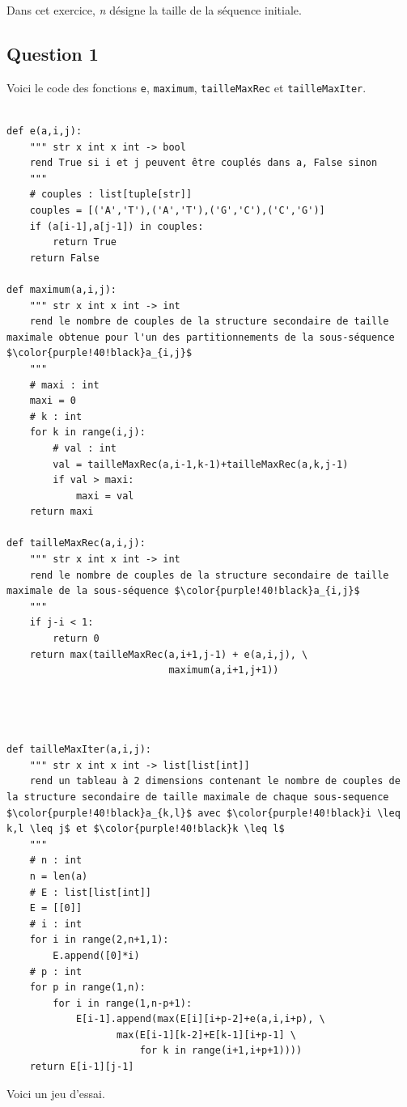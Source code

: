 \documentclass[12pt,a4paper]{article}
\begin{document}
Dans cet exercice, {\itshape n} d\'esigne la taille de la s\'equence initiale.

\subsection{Question 1}
Voici le code des fonctions \texttt{e}, \texttt{maximum}, \texttt{tailleMaxRec} et \texttt{tailleMaxIter}.
\begin{lstlisting}[mathescape]

def e(a,i,j):
    """ str x int x int -> bool
    rend True si i et j peuvent être couplés dans a, False sinon
    """
    # couples : list[tuple[str]]
    couples = [('A','T'),('A','T'),('G','C'),('C','G')]
    if (a[i-1],a[j-1]) in couples:
        return True
    return False

def maximum(a,i,j):
    """ str x int x int -> int
    rend le nombre de couples de la structure secondaire de taille maximale obtenue pour l'un des partitionnements de la sous-séquence $\color{purple!40!black}a_{i,j}$
    """
    # maxi : int
    maxi = 0
    # k : int
    for k in range(i,j):
        # val : int
        val = tailleMaxRec(a,i-1,k-1)+tailleMaxRec(a,k,j-1)
        if val > maxi:
            maxi = val
    return maxi

def tailleMaxRec(a,i,j):
    """ str x int x int -> int
    rend le nombre de couples de la structure secondaire de taille maximale de la sous-séquence $\color{purple!40!black}a_{i,j}$
    """
    if j-i < 1:
        return 0
    return max(tailleMaxRec(a,i+1,j-1) + e(a,i,j), \
                            maximum(a,i+1,j+1))




def tailleMaxIter(a,i,j):  
    """ str x int x int -> list[list[int]]
    rend un tableau à 2 dimensions contenant le nombre de couples de la structure secondaire de taille maximale de chaque sous-sequence $\color{purple!40!black}a_{k,l}$ avec $\color{purple!40!black}i \leq k,l \leq j$ et $\color{purple!40!black}k \leq l$
    """
    # n : int
    n = len(a)
    # E : list[list[int]]
    E = [[0]]
    # i : int
    for i in range(2,n+1,1):
        E.append([0]*i)
    # p : int
    for p in range(1,n):
        for i in range(1,n-p+1):
            E[i-1].append(max(E[i][i+p-2]+e(a,i,i+p), \
                   max(E[i-1][k-2]+E[k-1][i+p-1] \
                       for k in range(i+1,i+p+1))))
    return E[i-1][j-1]
\end{lstlisting}


Voici un jeu d'essai.
\end{document}
